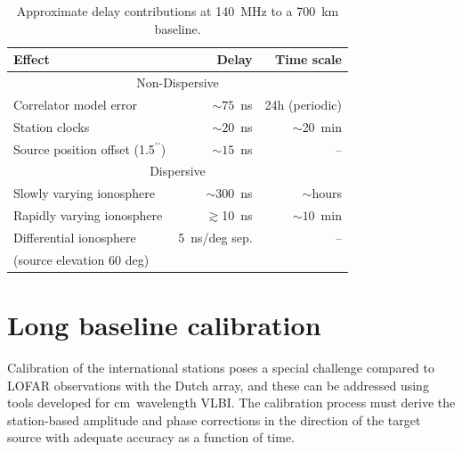 \documentclass[graybox]{svmult}
\begin{document}
\begin{table}
\caption{Approximate delay contributions at 140~MHz to a 700~km baseline.}             %
\label{tab:expecteddelay}
\centering
\begin{tabular}{l r r}
\hline\hline
Effect  & Delay  & Time scale \\
\hline
     \multicolumn{3}{c}{Non-Dispersive}   \\
\hline
Correlator model error      & $\sim75$~ns         &  24h (periodic)   \\
Station clocks              & $\sim20$~ns        & $\sim$20~min \\
Source position offset (1.5$^{\prime\prime}$)        & $\sim15$~ns        & --  \\
\hline
     \multicolumn{3}{c}{Dispersive}   \\
\hline
Slowly varying ionosphere   & $\sim300$~ns      & $\sim$hours \\
Rapidly varying ionosphere  & $\gtrsim$10~ns         & $\sim10$~min  \\
Differential ionosphere     & 5~ns/deg sep.      & -- \\
(source elevation 60 deg)   &                    &  \\

\hline                                   %
\end{tabular}
\end{table}
%



\section{Long baseline calibration}
\label{sec:calibration}

Calibration of the international stations poses a special challenge compared to
LOFAR observations with the Dutch array, and these can be addressed using tools
developed for cm~wavelength VLBI.  The calibration process must derive the
station-based amplitude and phase corrections in the direction of the target
source with adequate accuracy as a function of time. 
\end{document}
